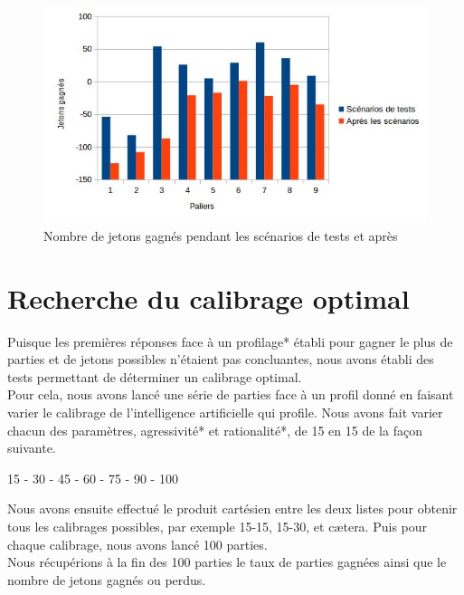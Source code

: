 \documentclass{report}
\begin{document}
\begin{figure}[H]
	\begin{center}
		\includegraphics[scale=0.5]{./imagesRapport/PremierCalibrageComparaisonJetonsGagnees.jpg}
	\end{center}
	\caption{Nombre de jetons gagnés pendant les scénarios de tests et après}
\end{figure}


\section{Recherche du calibrage optimal}

\hspace{0.5cm}Puisque les premières réponses face à un profilage* établi pour gagner le plus de parties et de jetons possibles n'étaient pas concluantes, nous avons établi des tests permettant de déterminer un calibrage optimal.\\

Pour cela, nous avons lancé une série de parties face à un profil donné en faisant varier le calibrage de l'intelligence artificielle qui profile. Nous avons fait varier chacun des paramètres, agressivité* et rationalité*, de 15 en 15 de la façon suivante.\\

\begin{center}
15 - 30 - 45 - 60 - 75 - 90 - 100
\end{center}


Nous avons ensuite effectué le produit cartésien entre les deux listes pour obtenir tous les calibrages possibles, par exemple 15-15, 15-30, et cætera. Puis pour chaque calibrage, nous avons lancé 100 parties.\\

Nous récupérions à la fin des 100 parties le taux de parties gagnées ainsi que le nombre de jetons gagnés ou perdus.\\
\end{document}

